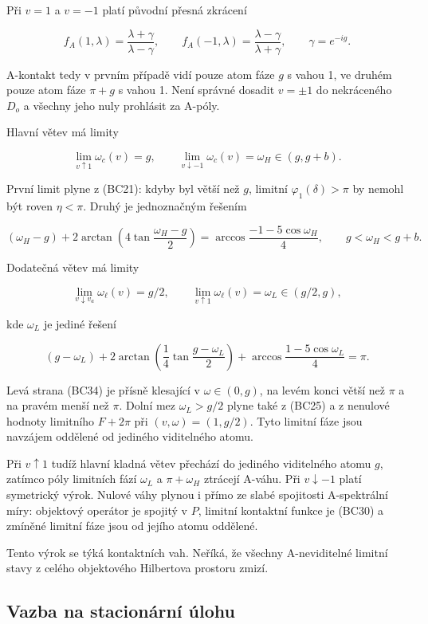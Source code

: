 \documentclass[11pt,a4paper]{article}
\theoremstyle{remark}\newtheorem{remark}[theorem]{Poznámka}
\numberwithin{equation}{section}
\begin{document}
Při \(v=1\) a \(v=-1\) platí původní přesná zkrácení

\[
f_A(1,\lambda)=\frac{\lambda+\gamma}{\lambda-\gamma},
\qquad
f_A(-1,\lambda)=\frac{\lambda-\gamma}{\lambda+\gamma},
\qquad \gamma=e^{-ig}.
\tag{BC30}
\]

A-kontakt tedy v prvním případě vidí pouze atom fáze \(g\) s vahou 1, ve
druhém pouze atom fáze \(\pi+g\) s vahou 1. Není správné dosadit
\(v=\pm1\) do nekráceného \(D_o\) a všechny jeho nuly prohlásit za
A-póly.

Hlavní větev má limity

\[
\lim_{v\uparrow1}\omega_c(v)=g,
\qquad
\lim_{v\downarrow-1}\omega_c(v)=\omega_H\in(g,g+b).
\tag{BC31}
\]

První limit plyne z (BC21): kdyby byl větší než \(g\), limitní
\(\varphi_1(\delta)>\pi\) by nemohl být roven \(\eta<\pi\). Druhý je
jednoznačným řešením

\[
(\omega_H-g)
+2\arctan\left(4\tan\frac{\omega_H-g}{2}\right)
=\arccos\frac{-1-5\cos\omega_H}{4},
\qquad g<\omega_H<g+b.
\tag{BC32}
\]

Dodatečná větev má limity

\[
\lim_{v\downarrow v_a}\omega_\ell(v)=g/2,
\qquad
\lim_{v\uparrow1}\omega_\ell(v)=\omega_L\in(g/2,g),
\tag{BC33}
\]

kde \(\omega_L\) je jediné řešení

\[
(g-\omega_L)
+2\arctan\left(\frac14\tan\frac{g-\omega_L}{2}\right)
+\arccos\frac{1-5\cos\omega_L}{4}=\pi.
\tag{BC34}
\]

Levá strana (BC34) je přísně klesající v \(\omega\in(0,g)\), na levém
konci větší než \(\pi\) a na pravém menší než \(\pi\). Dolní mez
\(\omega_L>g/2\) plyne také z (BC25) a z nenulové hodnoty limitního
\(F+2\pi\) při \((v,\omega)=(1,g/2)\). Tyto limitní fáze jsou navzájem
oddělené od jediného viditelného atomu.

Při \(v\uparrow1\) tudíž hlavní kladná větev přechází do jediného
viditelného atomu \(g\), zatímco póly limitních fází \(\omega_L\) a
\(\pi+\omega_H\) ztrácejí A-váhu. Při \(v\downarrow-1\) platí symetrický
výrok. Nulové váhy plynou i přímo ze slabé spojitosti A-spektrální míry:
objektový operátor je spojitý v \(P\), limitní kontaktní funkce je
(BC30) a zmíněné limitní fáze jsou od jejího atomu oddělené.

Tento výrok se týká kontaktních vah. Neříká, že všechny A-neviditelné
limitní stavy z celého objektového Hilbertova prostoru zmizí.

\hypertarget{vazba-na-stacionuxe1rnuxed-uxfalohu}{%
\subsection{Vazba na stacionární
úlohu}\label{vazba-na-stacionuxe1rnuxed-uxfalohu}}
\end{document}
